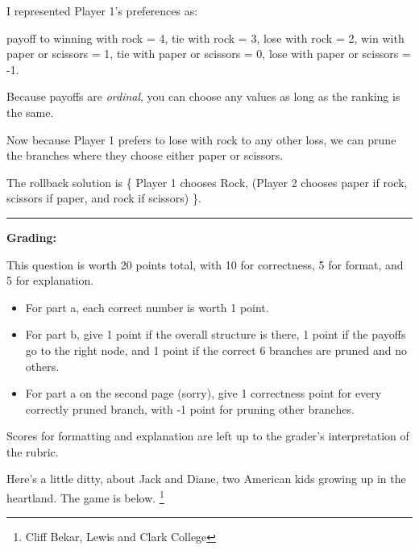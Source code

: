 \documentclass[addpoints, answers]{exam}
\begin{document}
\begin{questions}
\begin{solution}
\begin{parts}
  I represented Player 1's preferences as:

  payoff to winning with rock = 4,
  tie with rock = 3, 
  lose with rock = 2,
  win with paper or scissors = 1,
  tie with paper or scissors = 0,
  lose with paper or scissors = -1.

  Because payoffs are \textit{ordinal}, 
  you can choose any values as long as the ranking is the same.

  Now because Player 1 prefers to lose with rock to any other loss, 
  we can prune the branches where they choose either 
  paper or scissors.
  
  The rollback solution is 
  \{ Player 1 chooses Rock, 
  (Player 2 chooses paper if rock,
  scissors if paper,
  and rock if scissors) \}.

  \noindent\rule[0.5ex]{\linewidth}{1pt}
   
  \textbf{Grading:}

  This question is worth 20 points total, 
  with 10 for correctness, 5 for format, and 5 for explanation.

  \begin{itemize}
  \item 
  For part a, each correct number is worth 1 point.

  \item
  For part b, give 1 point if the overall structure is there,
  1 point if the payoffs go to the right node, 
  and 1 point if the correct 6 branches are pruned and no others.
  
  \item
  For part a on the second page (sorry), 
  give 1 correctness point for every correctly pruned branch,
  with -1 point for pruning other branches.
  \end{itemize}

  Scores for formatting and explanation are left up to the grader's interpretation of the rubric.

\end{parts}
\end{solution}

\newpage


\question%
Here's a little ditty, about Jack and Diane,
two American kids growing up in the heartland.
The game is below.
\footnote{Cliff Bekar, Lewis and Clark College}


\end{questions}
\end{document}
